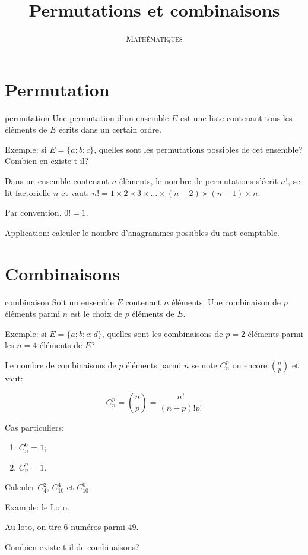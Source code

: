 \documentclass[a4paper,12pt]{scrartcl}
\date{}
\title{Permutations et combinaisons}
\author{\textsc{Mathématiques}}
\begin{document}
\maketitle


\section{Permutation}

\begin{definition}{permutation}
 Une permutation d'un ensemble $E$ est une liste contenant tous les éléments de $E$ écrits dans un certain ordre. 
\end{definition}

Exemple: si $E = \{a; b; c\}$, quelles sont les permutations possibles de cet ensemble? Combien en existe-t-il?


Dans un ensemble contenant $n$ éléments, le nombre de permutations s'écrit $n!$, se lit \og{}factorielle $n$\fg{} et vaut: $n! = 1 \times 2 \times 3 \times \ldots \times (n-2) \times (n-1) \times n$.

Par convention, $0! = 1$.

Application: calculer le nombre d'anagrammes possibles du mot \og{}comptable\fg{}.


\section{Combinaisons}

\begin{definition}{combinaison}
 Soit un ensemble $E$ contenant $n$ éléments. 
 Une combinaison de $p$ éléments parmi $n$ est le choix de $p$ éléments de $E$.
\end{definition}

Exemple: si $E = \{a;b;c;d\}$, quelles sont les combinaisons de $p = 2$ éléments parmi les $n = 4$ éléments de $E$?


Le nombre de combinaisons de $p$ éléments parmi $n$ se note $C_n^p$ ou encore $\binom{n}{p}$ et vaut:

\begin{equation*}
 C_n^p = \binom{n}{p} = \dfrac{n!}{(n-p)! p!}
\end{equation*}


Cas particuliers: 

\begin{enumerate}
 \item $C_n^0 = 1$;
 \item $C_n^n = 1$.
\end{enumerate}

Calculer $C_{4}^2$, $C_{10}^4$ et $C_{10}^0$.


Example: le Loto.

Au loto, on tire 6 numéros parmi 49.

Combien existe-t-il de combinaisons? 

\end{document}
